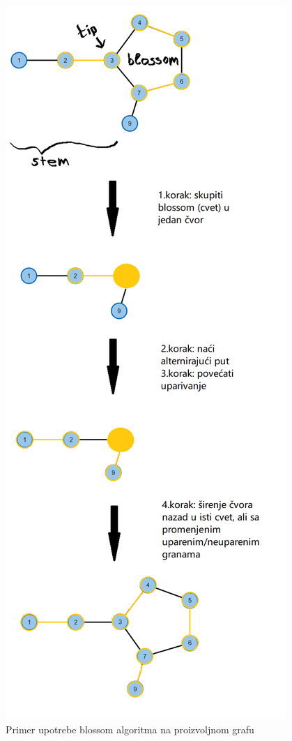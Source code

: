 \documentclass[a4paper]{article}
\theoremstyle{definition}
\begin{document}
\newpage
\begin{figure}[H]
\begin{center}
\includegraphics[scale=0.63]{Screenshot (363).png}
\end{center}
\caption{Primer upotrebe blossom algoritma na proizvoljnom grafu}
\label{fig:slika 44}
\end{figure}
\end{document}
